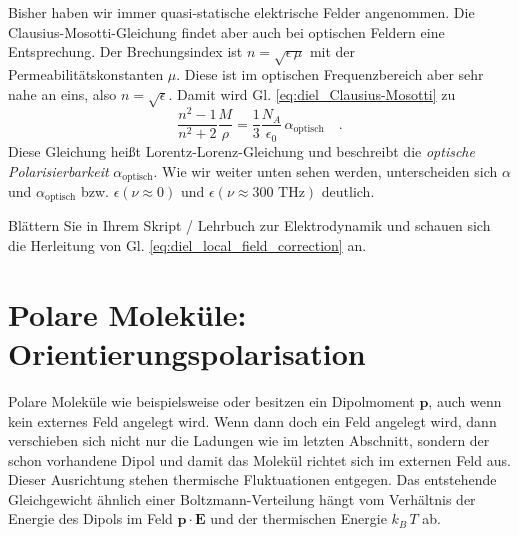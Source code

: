 Bisher haben wir immer quasi-statische elektrische Felder angenommen.  Die Clausius-Mosotti-Gleichung findet aber auch bei optischen Feldern eine Entsprechung. Der Brechungsindex ist $n = \sqrt{\epsilon \, \mu}$ mit der Permeabilitätskonstanten $\mu$. Diese ist im optischen Frequenzbereich aber sehr nahe an eins, also $n = \sqrt{\epsilon }$. Damit wird Gl. \ref{eq:diel_Clausius-Mosotti} zu 
  \begin{equation}
 \frac{n^2 - 1}{n^2 + 2} \frac{M}{\rho} = \frac{1}{3} \frac{N_A}{\epsilon
_0} \, \alpha_\text{optisch} \quad . \label{eq:diel_Lorentz_Lorenz}
 \end{equation}
 Diese Gleichung heißt Lorentz-Lorenz-Gleichung und beschreibt die \emph{optische Polarisierbarkeit} $\alpha_\text{optisch}$. Wie wir weiter unten sehen werden, unterscheiden sich $\alpha$ und  $\alpha_\text{optisch}$ bzw. $\epsilon(\nu \approx 0)$ und $\epsilon(\nu \approx 300 \text{ THz})$ deutlich.
 
 
\begin{questions} 
\item Blättern Sie in Ihrem Skript / Lehrbuch zur Elektrodynamik und schauen sich die Herleitung von Gl. \ref{eq:diel_local_field_correction} an.
\end{questions}
 
\section{Polare Moleküle: Orientierungspolarisation}
 
Polare Moleküle wie beispielsweise  oder  besitzen ein Dipolmoment $\mathbf{p}$, auch wenn kein externes Feld angelegt wird. Wenn dann doch ein Feld angelegt wird, dann verschieben sich nicht nur die Ladungen wie im letzten Abschnitt, sondern der schon vorhandene Dipol und damit das Molekül richtet sich im externen Feld aus. Dieser Ausrichtung stehen thermische Fluktuationen entgegen. Das entstehende Gleichgewicht ähnlich einer Boltzmann-Verteilung hängt vom Verhältnis der Energie des Dipols im Feld $\mathbf{p} \cdot \mathbf{E}$ und der thermischen Energie $k_B \, T$ ab. 

